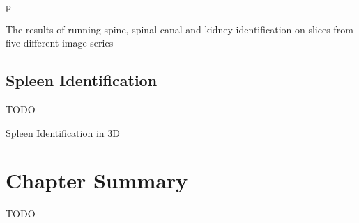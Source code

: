 \begin{stusubfig}{p}
	\\
\caption{The results of running spine, spinal canal and kidney identification on slices from five different image series}
\label{fig:featureid-3d-kidneysidentification-results}
\end{stusubfig}

\afterpage{\clearpage}
\newpage

\subsection{Spleen Identification}

TODO

\begin{stulisting}[p]
\caption{Spleen Identification in 3D}
\label{code:featureid-3d-spleenidentification}

\end{stulisting}

\afterpage{\clearpage}
\newpage

\section{Chapter Summary}

TODO
